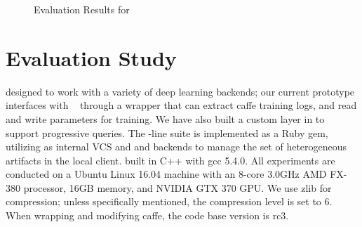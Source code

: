 \documentclass[conference]{IEEEtran}
\begin{document}
\begin{figure*}[!t]
\caption{Evaluation Results for \weightstore}
\label{fig:paseval}
\end{figure*}



\section{Evaluation Study}
\label{sec:experiments}
\modelhub\is designed to work with a variety of deep learning backends; our
current prototype interfaces with ~\cite{caffe2014mm} through a wrapper that can
extract caffe training logs, and read and write parameters for training. We have
also built a custom layer in  to support progressive queries. 
The \dlv\command-line suite is implemented as a Ruby
gem, utilizing  as internal VCS and  and \weightstore\as
backends to manage the set of heterogeneous artifacts in the local client.
\weightstore\is built in C++ with gcc 5.4.0. All experiments are conducted on a
Ubuntu Linux 16.04 machine with an 8-core 3.0GHz AMD FX-380 processor, 16GB
memory,
and NVIDIA GTX 370 GPU. We use zlib for compression; unless
specifically mentioned, the compression level is set to 6. When wrapping
and modifying caffe, the code base version is rc3.
\end{document}
